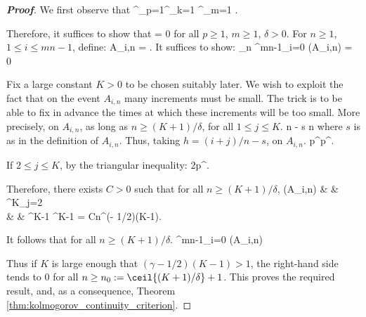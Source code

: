 \begin{proof}[\bf Proof]
We first observe that
\beast
{} \subseteq \bigcup^\infty_{p=1}\bigcup^\infty_{k=1} \bigcup^\infty_{m=1} .
\eeast

Therefore, it suffices to show that
\be
\pro{} = 0
\ee
for all $p \geq 1$, $m \geq 1$, $\delta > 0$. For $n \geq 1$, $1 \leq i \leq mn - 1$, define:
\be
A_{i,n} = .
\ee
It suffices to show:
\be
\lim_{n\to \infty} \sum^{mn-1}_{i=0} \pro(A_{i,n}) = 0
\ee

Fix a large constant $K > 0$ to be chosen suitably later. We wish to exploit the fact that on the event $A_{i,n}$ many increments must be small. The trick is to be able to fix in advance the times at which these increments will be too small. More precisely, on $A_{i,n}$, as long as $n \geq (K + 1)/\delta$, for all $1 \leq j \leq K$.
 \leq {}n - s \leq {}n \leq \delta
\ee
where $s$ is as in the definition of $A_{i,n}$. Thus, taking $h = (i + j)/n - s$, on $A_{i,n}$.
\be
{} \leq p^\gamma \leq p^\gamma.
\ee

If $2 \leq j \leq K$, by the triangular inequality:
\be
{}\leq 2p^\gamma.
\ee

Therefore, there exists $C > 0$ such that for all $n \geq (K + 1)/\delta$,
\beast
\pro(A_{i,n}) & \leq & \pro{} \leq \prod^K_{j=2} \pro{} \\
& \leq & ^{K-1} \leq {}^{K-1} = \frac C{n^{(\gamma - 1/2)(K-1)}}.
\eeast

It follows that for all $n \geq (K + 1)/\delta$.
\be
\sum^{mn-1}_{i=0} \pro(A_{i,n}) \leq {}
\ee

Thus if $K$ is large enough that $(\gamma - 1/2)(K - 1) > 1$, the right-hand side tends to 0 for all $n \geq n_0 := \ceil{(K + 1)/\delta} + 1$. This proves the required result, and, as a consequence, Theorem \ref{thm:kolmogorov_continuity_criterion}.
\end{proof}

